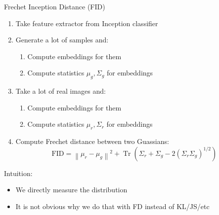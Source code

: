 \documentclass[handout, 10pt]{beamer}
\begin{document}
\begin{frame}{Frechet Inception Distance (FID)}
    \begin{enumerate}
        \item\pause Take feature extractor from Inception classifier
        \item\pause Generate a lot of samples and:
            \begin{enumerate}
                \item\pause Compute embeddings for them
                \item\pause Compute statistics $\mu_g, \Sigma_g$ for embeddings
            \end{enumerate}
        \item\pause Take a lot of real images and:
            \begin{enumerate}
                \item\pause Compute embeddings for them
                \item\pause Compute statistics $\mu_r, \Sigma_r$ for embeddings
            \end{enumerate}
        \item\pause Compute Frechet distance between two Guassians:
\begin{equation}
\mathrm{FID}=\left\|\mu_{r}-\mu_{g}\right\|^{2}+\operatorname{Tr}\left(\Sigma_{r}+\Sigma_{g}-2\left(\Sigma_{r} \Sigma_{g}\right)^{1 / 2}\right)
\end{equation}
\end{enumerate}

\pause
Intuition:
\begin{itemize}
    \item\pause We directly measure the distribution
    \item\pause It is not obvious why we do that with FD instead of KL/JS/etc
\end{itemize}
    
\end{frame}
\end{document}
